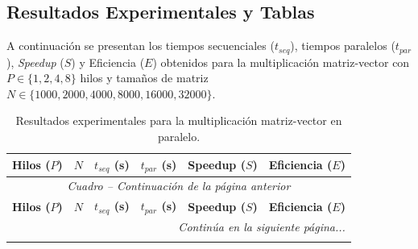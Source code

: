 \documentclass[11pt,a4paper]{article}
\begin{document}
\subsection{Resultados Experimentales y Tablas}

A continuación se presentan los tiempos secuenciales ($t_{seq}$), tiempos paralelos ($t_{par}$), \textit{Speedup} ($S$) y Eficiencia ($E$) obtenidos para la multiplicación matriz-vector con $P \in \{1, 2, 4, 8\}$ hilos y tamaños de matriz $N \in \{1000, 2000, 4000, 8000, 16000, 32000\}$.

\begin{center}
\setlength{\tabcolsep}{3pt}
\begin{longtable}{ccrrrr}
\caption{Resultados experimentales para la multiplicación matriz-vector en paralelo.} \label{tab:resultados_mat_vect} \\
\hline
\textbf{Hilos ($P$)} & \textbf{$N$} & \textbf{$t_{seq}$ (s)} & \textbf{$t_{par}$ (s)} & \textbf{Speedup ($S$)} & \textbf{Eficiencia ($E$)} \\ \hline
\endfirsthead

\multicolumn{6}{c}{\textit{Cuadro \thetable{} -- Continuación de la página anterior}} \\[0.5em]
\hline
\textbf{Hilos ($P$)} & \textbf{$N$} & \textbf{$t_{seq}$ (s)} & \textbf{$t_{par}$ (s)} & \textbf{Speedup ($S$)} & \textbf{Eficiencia ($E$)} \\ \hline
\endhead

\hline
\multicolumn{6}{r}{\textit{Continúa en la siguiente página...}} \\
\endfoot

\hline
\endlastfoot


\end{longtable}
\end{center}
\end{document}
